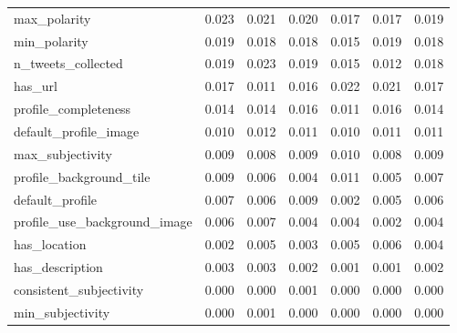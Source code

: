 \begin{tabular}{lrrrrrr}
max_polarity & 0.023 & 0.021 & 0.020 & 0.017 & 0.017 & 0.019 \\
min_polarity & 0.019 & 0.018 & 0.018 & 0.015 & 0.019 & 0.018 \\
n_tweets_collected & 0.019 & 0.023 & 0.019 & 0.015 & 0.012 & 0.018 \\
has_url & 0.017 & 0.011 & 0.016 & 0.022 & 0.021 & 0.017 \\
profile_completeness & 0.014 & 0.014 & 0.016 & 0.011 & 0.016 & 0.014 \\
default_profile_image & 0.010 & 0.012 & 0.011 & 0.010 & 0.011 & 0.011 \\
max_subjectivity & 0.009 & 0.008 & 0.009 & 0.010 & 0.008 & 0.009 \\
profile_background_tile & 0.009 & 0.006 & 0.004 & 0.011 & 0.005 & 0.007 \\
default_profile & 0.007 & 0.006 & 0.009 & 0.002 & 0.005 & 0.006 \\
profile_use_background_image & 0.006 & 0.007 & 0.004 & 0.004 & 0.002 & 0.004 \\
has_location & 0.002 & 0.005 & 0.003 & 0.005 & 0.006 & 0.004 \\
has_description & 0.003 & 0.003 & 0.002 & 0.001 & 0.001 & 0.002 \\
consistent_subjectivity & 0.000 & 0.000 & 0.001 & 0.000 & 0.000 & 0.000 \\
min_subjectivity & 0.000 & 0.001 & 0.000 & 0.000 & 0.000 & 0.000 \\
\bottomrule
\end{tabular}
